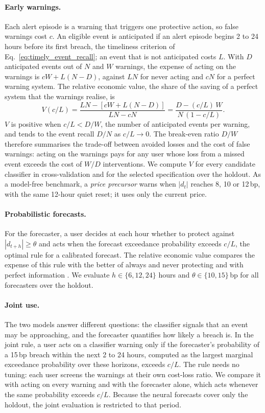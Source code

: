 \paragraph{Early warnings.} Each alert episode is a warning that triggers one protective action, so false
warnings cost $c$. An eligible event is anticipated if an alert episode begins 2 to 24 hours before its first
breach, the timeliness criterion of Eq.~\eqref{eq:timely_event_recall}; an event that is not anticipated
costs $L$. With $D$ anticipated events out of $N$ and $W$ warnings, the expense of acting on the warnings is
$cW+L(N-D)$, against $LN$ for never acting and $cN$ for a perfect warning system. The relative economic value,
the share of the saving of a perfect system that the warnings realise, is
\begin{equation}
V(c/L)=\frac{LN-\left[cW+L(N-D)\right]}{LN-cN}=\frac{D-(c/L)\,W}{N\,(1-c/L)}.
\label{eq:cl_value}
\end{equation}
$V$ is positive when $c/L<D/W$, the number of anticipated events per warning, and tends to the event recall
$D/N$ as $c/L\to0$. The break-even ratio $D/W$ therefore summarises the trade-off between avoided losses and
the cost of false warnings: acting on the warnings pays for any user whose loss from a missed event exceeds the
cost of $W/D$ interventions. We compute $V$ for every candidate classifier in cross-validation and for the
selected specification over the holdout. As a model-free benchmark, a \emph{price precursor} warns when
$|d_t|$ reaches 8, 10 or 12\,bp, with the same 12-hour quiet reset; it uses only the current price.

\paragraph{Probabilistic forecasts.} For the forecaster, a user decides at each hour whether to protect
against $|d_{t+h}|\geq\theta$ and acts when the forecast exceedance probability exceeds $c/L$, the optimal
rule for a calibrated forecast. The relative economic value compares the expense of this rule with the
better of always and never protecting and with perfect information \citep{Richardson2000}. We evaluate
$h\in\{6,12,24\}$ hours and $\theta\in\{10,15\}$\,bp for all forecasters over the holdout.

\paragraph{Joint use.} The two models answer different questions: the classifier signals that an event may
be approaching, and the forecaster quantifies how likely a breach is. In the joint rule, a user acts on a
classifier warning only if the forecaster's probability of a 15\,bp breach within the next 2 to 24 hours,
computed as the largest marginal exceedance probability over these horizons, exceeds $c/L$. The rule needs
no tuning: each user screens the warnings at their own cost-loss ratio. We compare it with acting on every
warning and with the forecaster alone, which acts whenever the same probability exceeds $c/L$. Because the
neural forecasts cover only the holdout, the joint evaluation is restricted to that period.



